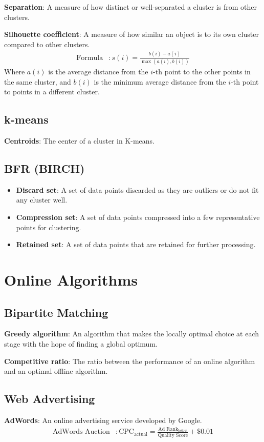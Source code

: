 \documentclass{article}
\begin{document}
\textbf{Separation}: A measure of how distinct or well-separated a cluster is from other clusters.

\textbf{Silhouette coefficient}: A measure of how similar an object is to its own cluster compared to other clusters.
\begin{align*}
    \text{Formula} &: s(i) = \frac{b(i) - a(i)}{\max(a(i), b(i))}
\end{align*}
Where \( a(i) \) is the average distance from the \( i \)-th point to the other points in the same cluster, and \( b(i) \) is the minimum average distance from the \( i \)-th point to points in a different cluster.

\subsection{k-means}
\textbf{Centroids}: The center of a cluster in K-means.

\subsection{BFR (BIRCH)}
\begin{itemize}
    \item \textbf{Discard set}: A set of data points discarded as they are outliers or do not fit any cluster well.
    \item \textbf{Compression set}: A set of data points compressed into a few representative points for clustering.
    \item \textbf{Retained set}: A set of data points that are retained for further processing.
\end{itemize}

\section{Online Algorithms}

\subsection{Bipartite Matching}
\textbf{Greedy algorithm}: An algorithm that makes the locally optimal choice at each stage with the hope of finding a global optimum.

\textbf{Competitive ratio}: The ratio between the performance of an online algorithm and an optimal offline algorithm.

\subsection{Web Advertising}
\textbf{AdWords}: An online advertising service developed by Google.
\begin{align*}
    \text{AdWords Auction} &: \text{CPC}_{\text{actual}} = \frac{\text{Ad Rank}_{\text{below}}}{\text{Quality Score}} + \$0.01
\end{align*}
\end{document}
